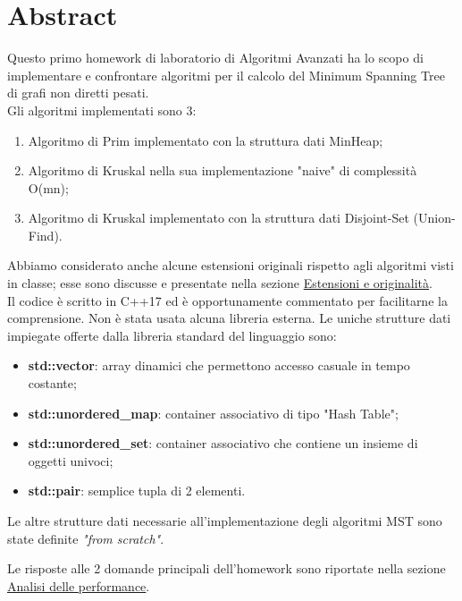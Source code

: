 \section{Abstract}
\label{cap:abstract}

Questo primo homework di laboratorio di Algoritmi Avanzati ha lo scopo di implementare e confrontare algoritmi per il calcolo del Minimum Spanning Tree di grafi non diretti pesati. \\

\noindent Gli algoritmi implementati sono 3:

\begin{enumerate}
    \item Algoritmo di Prim implementato con la struttura dati MinHeap;
    \item Algoritmo di Kruskal nella sua implementazione "naive" di complessità O(mn);
    \item Algoritmo di Kruskal implementato con la struttura dati Disjoint-Set (Union-Find).
\end{enumerate}

\noindent Abbiamo considerato anche alcune estensioni originali rispetto agli algoritmi visti in classe; esse sono discusse e presentate nella sezione \hyperref[cap:extensions-and-originalities]{Estensioni e originalità}. \\

\noindent Il codice è scritto in C++17 ed è opportunamente commentato per facilitarne la comprensione. Non è stata usata alcuna libreria esterna. Le uniche strutture dati impiegate offerte dalla libreria standard del linguaggio sono:

\begin{itemize}
    \item \textbf{std::vector}: array dinamici che permettono accesso casuale in tempo costante;
    \item \textbf{std::unordered\_map}: container associativo di tipo "Hash Table";
    \item \textbf{std::unordered\_set}: container associativo che contiene un insieme di oggetti univoci;
    \item \textbf{std::pair}: semplice tupla di 2 elementi.
\end{itemize}

Le altre strutture dati necessarie all'implementazione degli algoritmi MST sono state definite \textit{"from scratch"}.

\noindent Le risposte alle 2 domande principali dell'homework sono riportate nella sezione \hyperref[cap:performance-analysis]{Analisi delle performance}.
